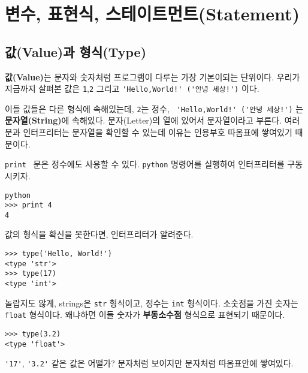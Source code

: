 
\chapter{변수, 표현식, 스테이트먼트(Statement)}

\section{값(Value)과 형식(Type)}

{\bf 값(Value)}는 문자와 숫자처럼 프로그램이 다루는 가장 기본이되는 단위이다. 우리가 지금까지 살펴본 값은 {\tt 1},{\tt 2} 그리고 \verb"'Hello,World!' ('안녕 세상!')" 이다.

이들 값들은 다른 형식에 속해있는데, {\tt 2}는 정수, \verb" 'Hello,World!' ('안녕 세상!')" 는 {\bf 문자열(String)}에 속해있다. 문자(Letter)의 열에 있어서 문자열이라고 부른다. 여러분과 인터프리터는 문자열을 확인할 수 있는데 이유는 인용부호 따옴표에 쌓여있기 때문이다.

{\tt print } 문은 정수에도 사용할 수 있다. {\tt python} 명령어를 실행하여 인터프리터를 구동시키자.


\beforeverb
\begin{verbatim}
python
>>> print 4
4
\end{verbatim}
\afterverb
%
값의 형식을 확신을 못한다면, 인터프리터가 알려준다.

\beforeverb
\begin{verbatim}
>>> type('Hello, World!')
<type 'str'>
>>> type(17)
<type 'int'>
\end{verbatim}
\afterverb
%

놀랍지도 않게, strings은 {\tt str} 형식이고, 정수는 {\tt int} 형식이다. 소숫점을 가진 숫자는 {\tt float} 형식이다. 왜냐하면 이들 숫자가 {\bf 부동소수점} 형식으로 표현되기 때문이다.


\beforeverb
\begin{verbatim}
>>> type(3.2)
<type 'float'>
\end{verbatim}
\afterverb
%
\verb"'17'", \verb"'3.2'" 같은 값은 어떨가? 문자처럼 보이지만 문자처럼 따옴표안에 쌓여있다.


